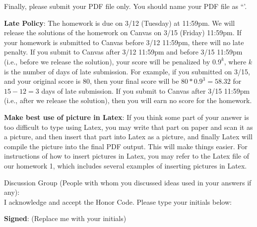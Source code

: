 \documentclass[12pt]{article}
\begin{document}
Finally, please submit your PDF file only. You should name your PDF file as ``{\color{blue}{Firstname-Lastname-NetID.pdf'}}'.


\vspace{.5cm}

\textbf{Late Policy}: The homework is due on 3/12 (Tuesday) at 11:59pm. We will release the solutions of the homework on Canvas on 3/15 (Friday) 11:59pm. If your homework is submitted to Canvas before 3/12 11:59pm, there will no late penalty. If you submit to Canvas after 3/12 11:59pm and before 3/15 11:59pm (i.e., before we release the solution), your score will be penalized by $0.9^k$, where $k$ is the number of days of late submission. For example, if you submitted on 3/15, and your original score is 80, then your final score will be $80*0.9^3=58.32$ for $15-12=3$ days of late submission. If you submit to Canvas after 3/15 11:59pm (i.e., after we release the solution), then you will earn no score for the homework.

\vspace{.5cm}

\textbf{Make best use of picture in Latex}: If you think some part of your answer is too difficult to type using Latex, you may write that part on paper and scan it as a picture, and then insert that part into Latex as a picture, and finally Latex will compile the picture into the final PDF output. This will make things easier. For instructions of how to insert pictures in Latex, you may refer to the Latex file of our homework 1, which includes several examples of inserting pictures in Latex.


\hrulefill

Discussion Group (People with whom you discussed ideas used in your answers if any):     \\[1ex]


I acknowledge and accept the Honor Code. Please type your initials below:

\textbf{Signed}: ({\color{blue}Replace me with your initials})

\hrulefill

\end{document}
